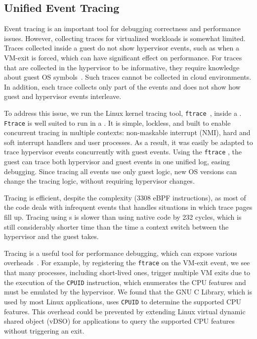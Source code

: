 \documentclass[11pt]{article}
\begin{document}
\subsection{Unified Event Tracing}
Event tracing is an important tool for debugging correctness
and performance issues. However, collecting traces for virtualized workloads 
is somewhat limited. Traces collected
inside a guest do not show hypervisor events, such as when a VM-exit is forced,
 which can have significant
effect on performance. For traces that are collected in the hypervisor
to be informative, they require knowledge about guest OS symbols~\cite{carbone14vprobes}. 
Such traces cannot be collected in cloud environments. In addition,
each trace collects only part of the events and does
not show how guest and hypervisor events interleave.

To address this issue, we run the Linux kernel tracing tool, \texttt{ftrace}~\cite{ftrace},
inside a \hypercallback. \texttt{Ftrace} is well suited to run in a \hypercallback. 
It is simple, lockless,
and built to enable concurrent tracing in multiple contexts: non-maskable
interrupt (NMI), hard and soft interrupt handlers and user processes.
As a result, it was easily be adapted to trace hypervisor events
 concurrently with guest events.
Using the \texttt{ftrace} \hypercallback, the guest can trace both hypervisor
and guest events in one unified log, easing debugging. Since tracing
all events use only guest logic, new OS versions can change the tracing logic, without requiring
hypervisor changes. 

Tracing is efficient, despite the \hypercallback
complexity (3308 eBPF instructions), as most of the code deals
with infrequent events that handles situations in which trace
pages fill up. Tracing using  \hypercallback{}s is slower than using
native code by 232 cycles, which
is still considerably shorter time than the time a context switch between the
hypervisor and the guest takes.

Tracing is a useful tool for performance debugging, which can
expose various overheads~\cite{zheng2009warp}. For example, 
by registering the \texttt{ftrace} on the VM-exit event, we see
that many processes, including short-lived ones, trigger multiple
VM exits due to the execution of the \texttt{CPUID} instruction, 
which enumerates the CPU
features and must be emulated by the hypervisor. We found
that the GNU C Library, which is
used by most Linux applications, uses \texttt{CPUID} 
to determine the supported CPU features. This overhead 
could be prevented by extending Linux virtual dynamic shared 
object (vDSO) for applications to query the supported CPU features
without triggering an exit.
\end{document}
